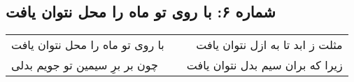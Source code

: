\begin{center}
\section*{شماره ۶: با روی تو ماه را محل نتوان یافت}
\label{sec:006}
\begin{longtable}{l p{0.5cm} r}
با روی تو ماه را محل نتوان یافت
&&
مثلت ز ابد تا به ازل نتوان یافت
\\
چون بر برِ سیمین تو جویم بدلی
&&
زیرا که بران سیم بدل نتوان یافت
\\
\end{longtable}
\end{center}
